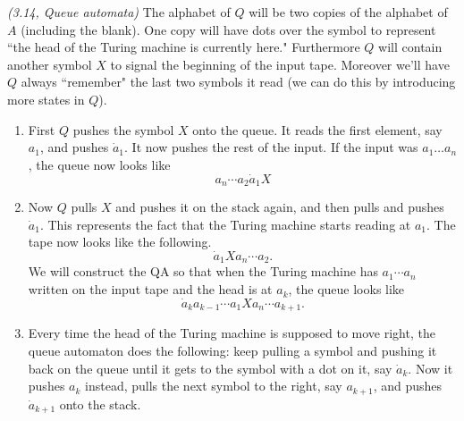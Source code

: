 \begin{problem}{\it (3.14, Queue automata)}
The alphabet of $Q$ will be two copies of the alphabet of $A$ (including the blank). One copy will have dots over the symbol to represent ``the head of the Turing machine is currently here." Furthermore $Q$ will contain another symbol $X$ to signal the beginning of the input tape. Moreover we'll have $Q$ always ``remember" the last two symbols it read (we can do this by introducing more states in $Q$).
\begin{enumerate}
\item
First $Q$ pushes the symbol $X$ onto the queue. It reads the first element, say $a_1$, and pushes $\dot{a}_1$. It now pushes the rest of the input.
If the input was $a_1\ldots a_n$, the queue now looks like
\[
a_n\cdots a_2\dot a_1X%
\]
\item
Now $Q$ pulls $X$ and pushes it on the stack again, and then pulls and pushes $\dot a_1$. 
%
This represents the fact that the Turing machine starts reading at $a_1$. The tape now looks like the following.
\[
\dot a_1X a_n\cdots a_2.
\]
We will construct the QA so that when the Turing machine has $a_1\cdots a_n$ written on the input tape and the head is at $a_k$, the queue looks like
\[
\dot a_k a_{k-1}\cdots a_1 X a_n\cdots a_{k+1}.
\]
\item
Every time the head of the Turing machine is supposed to move right, the queue automaton does the following: keep pulling a symbol and pushing it back on the queue %
until it gets to the symbol with a dot on it, say $\dot a_k$. Now it pushes $a_k$ instead, pulls the next symbol to the right, say $a_{k+1}$, and pushes $\dot a_{k+1}$ onto the stack.


\end{enumerate}
\end{problem}

